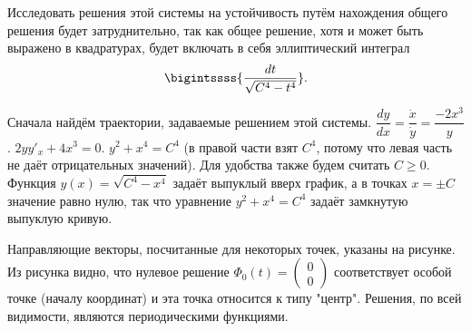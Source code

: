 \documentclass[a5paper,10pt]{article}
\newcommand{\br}[1]{\left(#1\right)}
\renewcommand{\ge}{\geqslant}
\begin{document}
Исследовать решения этой системы на устойчивость путём нахождения общего решения будет затруднительно, так как общее решение, хотя и может быть выражено в квадратурах, будет включать в себя эллиптический интеграл
$$\bigintssss{\frac {dt} {\sqrt{C^4 - t^4}}}.$$

Сначала найдём траектории, задаваемые решением этой системы. $\dfrac {dy} {dx} = \dfrac {\dot{x}} {\dot{y}} = \dfrac {-2x^3} {y}$. $2yy'_{x} + 4x^3 = 0$. $y^2 + x^4 = C^4$ (в правой части взят $C^4$, потому что левая часть не даёт отрицательных значений). Для удобства также будем считать $C \ge 0$. Функция \linebreak $y\br{x} = \sqrt{C^4 - x^4}$ задаёт выпуклый вверх график, а в точках $x = \pm C$ значение равно нулю, так что уравнение $y^2 + x^4 = C^4$ задаёт замкнутую выпуклую кривую.

Направляющие векторы, посчитанные для некоторых точек, указаны на рисунке. Из рисунка видно, что нулевое решение $\Phi_{0}\br{t} = \begin{pmatrix} 0 \\ 0 \end{pmatrix}$ соответствует особой точке (началу координат) и эта точка относится к типу "центр". Решения, по всей видимости, являются периодическими функциями.
\end{document}
